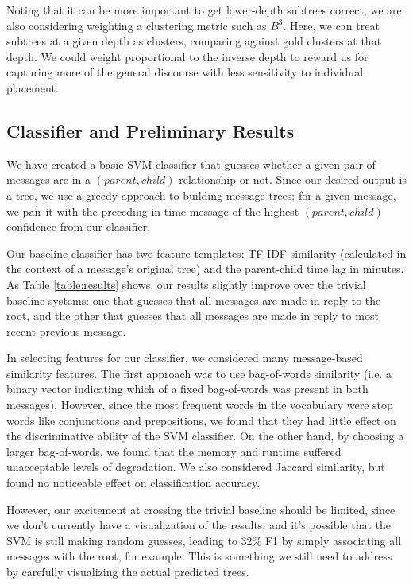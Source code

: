 \documentclass[10pt]{article}
\begin{document}
Noting that it can be more important to get lower-depth subtrees correct, we
are also considering weighting a clustering metric such as $B^3$. Here, we 
can treat subtrees at a given depth as clusters, comparing against gold 
clusters at that depth. We could weight proportional to the inverse depth to 
reward us for capturing more of the general discourse with less sensitivity 
to individual placement.

\subsection{Classifier and Preliminary Results}
\label{sec:classifier}
We have created a basic SVM classifier that guesses whether a given pair of
messages are in a $(parent, child)$ relationship or not. Since our desired
output is a tree, we use a greedy approach to building message trees: for a
given message, we pair it with the preceding-in-time message of the highest
$(parent, child)$ confidence from our classifier.

Our baseline classifier has two feature templates: TF-IDF similarity
(calculated in the context of a message's original tree) and the parent-child
time lag in minutes. As Table \ref{table:results} shows, our results slightly
improve over the trivial baseline systems: one that guesses that all messages
are made in reply to the root, and the other that guesses that all messages
are made in reply to most recent previous message.

In selecting features for our classifier, we considered many message-based
similarity features. The first approach was to use bag-of-words similarity
(i.e. a binary vector indicating which of a fixed bag-of-words was present in
both messages). However, since the most frequent words in the vocabulary were
stop words like conjunctions and prepositions, we found that they had little
effect on the discriminative ability of the SVM classifier. On the other hand, by choosing a larger bag-of-words, we found that the memory and runtime
suffered unacceptable levels of degradation. We also considered Jaccard similarity, but found no noticeable effect on classification accuracy.

However, our excitement at crossing the trivial baseline should be limited,
since we don't currently have a visualization of the results, and it's
possible that the SVM is still making random guesses, leading to 32\% F1 by
simply associating all messages with the root, for example. This is something
we still need to address by carefully visualizing the actual predicted trees.
\end{document}
